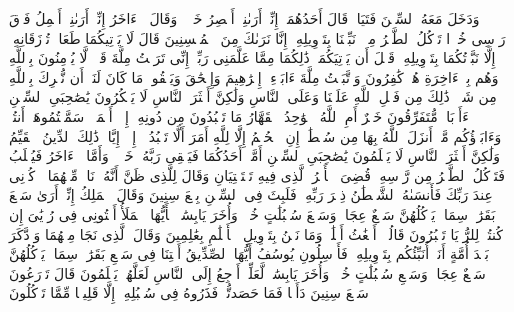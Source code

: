 وَدَخَلَ مَعَهُ ٱلسِّجۡنَ فَتَیَانِۖ قَالَ أَحَدُهُمَاۤ إِنِّیۤ أَرَىٰنِیۤ أَعۡصِرُ خَمۡرࣰاۖ وَقَالَ ٱلۡءَاخَرُ إِنِّیۤ أَرَىٰنِیۤ أَحۡمِلُ فَوۡقَ رَأۡسِی خُبۡزࣰا تَأۡكُلُ ٱلطَّیۡرُ مِنۡهُۖ نَبِّئۡنَا بِتَأۡوِیلِهِۦۤۖ إِنَّا نَرَىٰكَ مِنَ ٱلۡمُحۡسِنِینَ%
\stopbuffer%
\startbuffer[\q:12:37]
قَالَ لَا یَأۡتِیكُمَا طَعَامࣱ تُرۡزَقَانِهِۦۤ إِلَّا نَبَّأۡتُكُمَا بِتَأۡوِیلِهِۦ قَبۡلَ أَن یَأۡتِیَكُمَاۚ ذَٰلِكُمَا مِمَّا عَلَّمَنِی رَبِّیۤۚ إِنِّی تَرَكۡتُ مِلَّةَ قَوۡمࣲ لَّا یُؤۡمِنُونَ بِٱللَّهِ وَهُم بِٱلۡءَاخِرَةِ هُمۡ كَٰفِرُونَ%
\stopbuffer%
\startbuffer[\q:12:38]
وَٱتَّبَعۡتُ مِلَّةَ ءَابَاۤءِیۤ إِبۡرَٰهِیمَ وَإِسۡحَٰقَ وَیَعۡقُوبَۚ مَا كَانَ لَنَاۤ أَن نُّشۡرِكَ بِٱللَّهِ مِن شَیۡءࣲۚ ذَٰلِكَ مِن فَضۡلِ ٱللَّهِ عَلَیۡنَا وَعَلَى ٱلنَّاسِ وَلَٰكِنَّ أَكۡثَرَ ٱلنَّاسِ لَا یَشۡكُرُونَ%
\stopbuffer%
\startbuffer[\q:12:39]
یَٰصَٰحِبَیِ ٱلسِّجۡنِ ءَأَرۡبَابࣱ مُّتَفَرِّقُونَ خَیۡرٌ أَمِ ٱللَّهُ ٱلۡوَٰحِدُ ٱلۡقَهَّارُ%
\stopbuffer%
\startbuffer[\q:12:40]
مَا تَعۡبُدُونَ مِن دُونِهِۦۤ إِلَّاۤ أَسۡمَاۤءࣰ سَمَّیۡتُمُوهَاۤ أَنتُمۡ وَءَابَاۤؤُكُم مَّاۤ أَنزَلَ ٱللَّهُ بِهَا مِن سُلۡطَٰنٍۚ إِنِ ٱلۡحُكۡمُ إِلَّا لِلَّهِ أَمَرَ أَلَّا تَعۡبُدُوۤا۟ إِلَّاۤ إِیَّاهُۚ ذَٰلِكَ ٱلدِّینُ ٱلۡقَیِّمُ وَلَٰكِنَّ أَكۡثَرَ ٱلنَّاسِ لَا یَعۡلَمُونَ%
\stopbuffer%
\startbuffer[\q:12:41]
یَٰصَٰحِبَیِ ٱلسِّجۡنِ أَمَّاۤ أَحَدُكُمَا فَیَسۡقِی رَبَّهُۥ خَمۡرࣰاۖ وَأَمَّا ٱلۡءَاخَرُ فَیُصۡلَبُ فَتَأۡكُلُ ٱلطَّیۡرُ مِن رَّأۡسِهِۦۚ قُضِیَ ٱلۡأَمۡرُ ٱلَّذِی فِیهِ تَسۡتَفۡتِیَانِ%
\stopbuffer%
\startbuffer[\q:12:42]
وَقَالَ لِلَّذِی ظَنَّ أَنَّهُۥ نَاجࣲ مِّنۡهُمَا ٱذۡكُرۡنِی عِندَ رَبِّكَ فَأَنسَىٰهُ ٱلشَّیۡطَٰنُ ذِكۡرَ رَبِّهِۦ فَلَبِثَ فِی ٱلسِّجۡنِ بِضۡعَ سِنِینَ%
\stopbuffer%
\startbuffer[\q:12:43]
وَقَالَ ٱلۡمَلِكُ إِنِّیۤ أَرَىٰ سَبۡعَ بَقَرَٰتࣲ سِمَانࣲ یَأۡكُلُهُنَّ سَبۡعٌ عِجَافࣱ وَسَبۡعَ سُنۢبُلَٰتٍ خُضۡرࣲ وَأُخَرَ یَابِسَٰتࣲۖ یَٰۤأَیُّهَا ٱلۡمَلَأُ أَفۡتُونِی فِی رُءۡیَٰیَ إِن كُنتُمۡ لِلرُّءۡیَا تَعۡبُرُونَ%
\stopbuffer%
\startbuffer[\q:12:44]
قَالُوۤا۟ أَضۡغَٰثُ أَحۡلَٰمࣲۖ وَمَا نَحۡنُ بِتَأۡوِیلِ ٱلۡأَحۡلَٰمِ بِعَٰلِمِینَ%
\stopbuffer%
\startbuffer[\q:12:45]
وَقَالَ ٱلَّذِی نَجَا مِنۡهُمَا وَٱدَّكَرَ بَعۡدَ أُمَّةٍ أَنَا۠ أُنَبِّئُكُم بِتَأۡوِیلِهِۦ فَأَرۡسِلُونِ%
\stopbuffer%
\startbuffer[\q:12:46]
یُوسُفُ أَیُّهَا ٱلصِّدِّیقُ أَفۡتِنَا فِی سَبۡعِ بَقَرَٰتࣲ سِمَانࣲ یَأۡكُلُهُنَّ سَبۡعٌ عِجَافࣱ وَسَبۡعِ سُنۢبُلَٰتٍ خُضۡرࣲ وَأُخَرَ یَابِسَٰتࣲ لَّعَلِّیۤ أَرۡجِعُ إِلَى ٱلنَّاسِ لَعَلَّهُمۡ یَعۡلَمُونَ%
\stopbuffer%
\startbuffer[\q:12:47]
قَالَ تَزۡرَعُونَ سَبۡعَ سِنِینَ دَأَبࣰا فَمَا حَصَدتُّمۡ فَذَرُوهُ فِی سُنۢبُلِهِۦۤ إِلَّا قَلِیلࣰا مِّمَّا تَأۡكُلُونَ%
\stopbuffer%
\startbuffer[\q:12:48]
